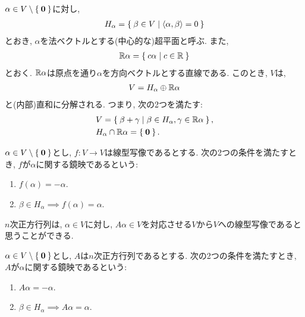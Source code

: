 $\alpha \in V\setminus\Set{\boldsymbol{0}}$に対し,
\begin{align*}
  H_\alpha = \Set{\beta \in V | \Braket{\alpha,\beta}=0}
\end{align*}
とおき, $\alpha$を法ベクトルとする(中心的な)超平面と呼ぶ.
また,
\begin{align*}
  \mathbb{R}\alpha = \Set{c \alpha | c\in \mathbb{R}}
\end{align*}
とおく. $\mathbb{R}\alpha$は原点を通り$\alpha$を方向ベクトルとする直線である.
このとき, $V$は,
\begin{align*}
  V =   H_\alpha \oplus   \mathbb{R}\alpha
\end{align*}
と(内部)直和に分解される.  つまり, 次の2つを満たす:
\begin{align*}
  &V = \Set{ \beta + \gamma | \beta \in H_\alpha, \gamma \in \mathbb{R}\alpha},\\
  &H_\alpha \cap   \mathbb{R}\alpha =\Set{\boldsymbol{0}}.
\end{align*}

\begin{definition}
  $\alpha \in V\setminus\Set{\boldsymbol{0}}$とし,
  $f\colon V\to V$は線型写像であるとする.
  次の2つの条件を満たすとき,
  $f$が$\alpha$に関する鏡映であるという:
  \begin{enumerate}
  \item $f(\alpha)=-\alpha$.
  \item $\beta \in H_\alpha \implies f(\alpha)=\alpha$.    
  \end{enumerate}
\end{definition}
$n$次正方行列は,
$\alpha\in V$に対し,
$A\alpha\in V$を対応させる$V$から$V$への線型写像であると思うことができる.

\begin{definition}
  $\alpha \in V\setminus\Set{\boldsymbol{0}}$とし,
  $A$は$n$次正方行列であるとする.
  次の2つの条件を満たすとき,
  $A$が$\alpha$に関する鏡映であるという:
  \begin{enumerate}
  \item $A\alpha=-\alpha$.
  \item $\beta \in H_\alpha \implies A\alpha=\alpha$.    
  \end{enumerate}
\end{definition}

